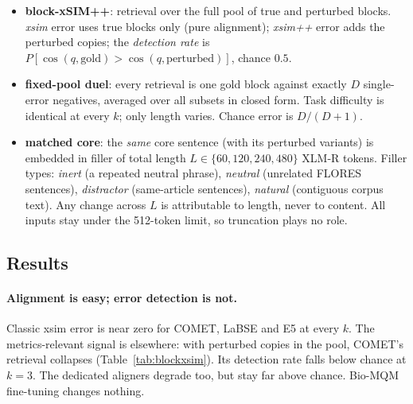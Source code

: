\documentclass[11pt]{article}
\begin{document}
\begin{itemize}
\item \textbf{block-xSIM++}: retrieval over the full pool of true and perturbed blocks. \emph{xsim} error uses true blocks only (pure alignment); \emph{xsim++} error adds the perturbed copies; the \emph{detection rate} is $P[\cos(q,\text{gold}) > \cos(q,\text{perturbed})]$, chance $0.5$.
\item \textbf{fixed-pool duel}: every retrieval is one gold block against exactly $D$ single-error negatives, averaged over all subsets in closed form. Task difficulty is identical at every $k$; only length varies. Chance error is $D/(D{+}1)$.
\item \textbf{matched core}: the \emph{same} core sentence (with its perturbed variants) is embedded in filler of total length $L \in \{60,120,240,480\}$ XLM-R tokens. Filler types: \emph{inert} (a repeated neutral phrase), \emph{neutral} (unrelated FLORES sentences), \emph{distractor} (same-article sentences), \emph{natural} (contiguous corpus text). Any change across $L$ is attributable to length, never to content. All inputs stay under the 512-token limit, so truncation plays no role.
\end{itemize}

\subsection{Results}

\paragraph{Alignment is easy; error detection is not.}
Classic xsim error is near zero for COMET, LaBSE and E5 at every $k$.
The metrics-relevant signal is elsewhere: with perturbed copies in the pool, COMET's retrieval collapses (Table~\ref{tab:blockxsim}).
Its detection rate falls below chance at $k{=}3$.
The dedicated aligners degrade too, but stay far above chance.
Bio-MQM fine-tuning changes nothing.
\end{document}
